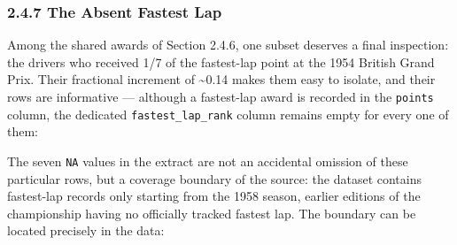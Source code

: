 \documentclass[
]{article}
\begin{document}
\subsubsection{2.4.7 The Absent Fastest
Lap}\label{the-absent-fastest-lap}

Among the shared awards of Section 2.4.6, one subset deserves a final
inspection: the drivers who received 1/7 of the fastest-lap point at the
1954 British Grand Prix. Their fractional increment of
\textasciitilde0.14 makes them easy to isolate, and their rows are
informative --- although a fastest-lap award is recorded in the
\texttt{points} column, the dedicated \texttt{fastest\_lap\_rank} column
remains empty for every one of them:

\begin{table}[!h]
\centering\begingroup\fontsize{8}{10}\selectfont

\endgroup{}
\end{table}

The seven \texttt{NA} values in the extract are not an accidental
omission of these particular rows, but a coverage boundary of the
source: the dataset contains fastest-lap records only starting from the
1958 season, earlier editions of the championship having no officially
tracked fastest lap. The boundary can be located precisely in the data:

\begin{table}[!h]
\centering\begingroup\fontsize{8}{10}\selectfont

\endgroup{}
\end{table}
\end{document}
